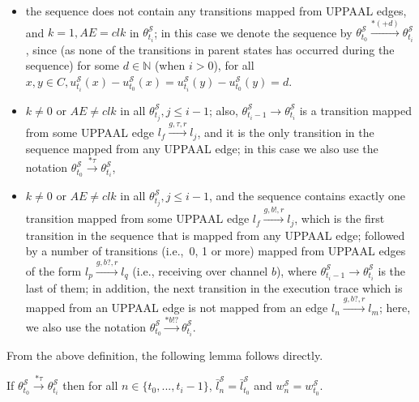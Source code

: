 \begin{itemize}

\item the sequence does not contain any transitions mapped from UPPAAL edges, and $k=1, AE=clk$ in $\theta^\mathcal{S}_{t_i}$; 
in this case we denote the sequence by $\theta^\mathcal{S}_{t_0}\xrightarrow{*(+d)}\theta^\mathcal{S}_{t_i}$, since (as none of the transitions in parent states has occurred during the sequence) for some $d\in\mathbb{N}$ (when $i>0$), for all $x,y\in C,u^\mathcal{S}_{t_i}(x)-u^\mathcal{S}_{t_0}(x)=u^\mathcal{S}_{t_i}(y)-u^\mathcal{S}_{t_0}(y)=d$.

\item $k\neq 0$ or $AE\neq clk$ in all $\theta^\mathcal{S}_{t_j},j\leq i-1$; 
also, $\theta^\mathcal{S}_{t_i-1}\rightarrow \theta^\mathcal{S}_{t_i}$ is a transition mapped from some UPPAAL edge $l_f \xrightarrow{g,\tau,r} l_j$, and it is the only transition in the sequence mapped from any UPPAAL edge; in this case we also use the notation $\theta^\mathcal{S}_{t_0}\xrightarrow{*\tau}\theta^\mathcal{S}_{t_i}$,

\item $k\neq 0$ or $AE\neq clk$ in all $\theta^\mathcal{S}_{t_j},j\leq i-1$, and the sequence contains exactly one transition mapped from some UPPAAL edge $l_f \xrightarrow{g,b!,r} l_j$, which is the first transition in the sequence that is mapped from any UPPAAL edge; 
followed by a number of  transitions (i.e.,~0, 1 or more) mapped from UPPAAL edges of the form $l_p \xrightarrow{g,b?,r} l_q$ (i.e., receiving over channel $b$), where  $\theta^\mathcal{S}_{t_i-1}\rightarrow \theta^\mathcal{S}_{t_i}$ is the last of them; in addition, the next transition in the execution trace which is mapped from an UPPAAL edge is not mapped from an edge $l_n \xrightarrow{g,b?,r} l_m$; here, we also use the notation $\theta^\mathcal{S}_{t_0}\xrightarrow{*b!?}\theta^\mathcal{S}_{t_i}$.

\end{itemize}

From the above definition, the following lemma follows directly.

\begin{lemma}
\label{same_lw}
If $\theta^\mathcal{S}_{t_0}\xrightarrow{*\tau}\theta^\mathcal{S}_{t_i}$ then for all $n\in\{t_0,...,t_i-1\}$, 
$\bar{l}^\mathcal{S}_n=\bar{l}^\mathcal{S}_{t_0}$ and $w^\mathcal{S}_n=w^\mathcal{S}_{t_0}$.
\end{lemma}



